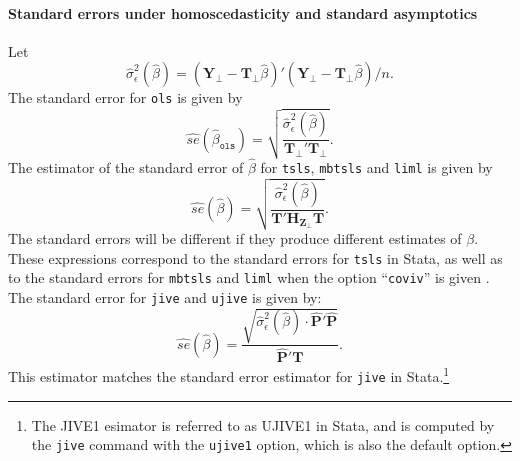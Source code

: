 \documentclass{mynotes}
\newcommand{\by}{\mathbf{Y}} %
\newcommand{\bt}{\mathbf{T}} %
\newcommand{\bz}{\mathbf{Z}} %
\newcommand{\bp}{\mathbf{P}} %
\newcommand{\Hm}[1]{\mathbf{H}_{#1}} %
\begin{document}
\paragraph{Standard errors under homoscedasticity and standard asymptotics}
Let
\begin{equation}\label{eq:sigeps}
  \hat{\sigma}^{2}_{\epsilon}(\hat{\beta})
  =  (\by_{\perp}-\bt_{\perp}\hat{\beta})'(\by_{\perp}
  -\bt_{\perp}\hat{\beta})/n.
\end{equation}
The standard error for \texttt{ols} is given by
\begin{equation*}
  \widehat{se}(\hat{\beta}_{\mathtt{ols}})=\sqrt{\frac{  \hat{\sigma}^{2}_{\epsilon}(\hat{\beta})}{
      \bt_{\perp}'\bt_{\perp}}}.
\end{equation*}
The estimator of the standard error of $\hat{\beta}$ for \texttt{tsls},
\texttt{mbtsls} and \texttt{liml} is given by
\begin{equation*}
  \widehat{se}(\hat{\beta})=\sqrt{\frac{  \hat{\sigma}^{2}_{\epsilon}(\hat{\beta})}{
      \bt'\Hm{\bz_{\perp}}\bt}}.
\end{equation*}
The standard errors will be different if they produce different estimates of
$\beta$. These expressions correspond to the standard errors for \texttt{tsls}
in Stata, as well as to the standard errors for \texttt{mbtsls} and
\texttt{liml} when the option ``\lstinline!coviv!'' is given \citep{bss07}. The
standard error for \texttt{jive} and \texttt{ujive} is given by:
\begin{equation*}
  \widehat{se}(\hat{\beta})
  =\frac{\sqrt{
      \hat{\sigma}^{2}_{\epsilon}(\hat{\beta})
      \cdot \hat{\bp}'\hat{\bp}}}{
      \hat{\bp}'\bt}.
\end{equation*}
This estimator matches the standard error estimator for \texttt{jive} in
Stata.\footnote{The \citet{aik99} JIVE1 esimator is referred to as UJIVE1 in
  Stata, and is computed by the \lstinline!jive! command with the
  \lstinline!ujive1! option, which is also the default option.}

\end{document}
